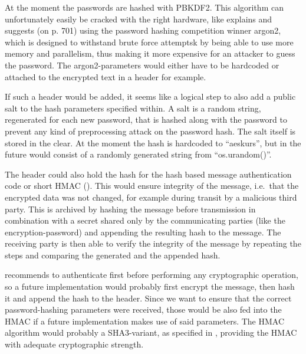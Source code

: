 At the moment the passwords are hashed with PBKDF2. This algorithm can
unfortunately easily be cracked with the right hardware, like \cite[p. 697]{appcrypt} explains and suggests (on p. 701) using the password hashing
competition winner argon2, which is designed to withstand brute force
attemptsk by being able to use more memory and parallelism, thus making it
more expensive for an attacker to guess the password. The
argon2-parameters would either have to be hardcoded or attached to the
encrypted text in a header for example.

If such a header would be added, it seems like a logical step to also
add a public salt to the hash parameters specified within. A salt is a
random string, regenerated for each new password, that is hashed along
with the password to prevent any kind of preprocessing attack on the
password hash. The salt itself is stored in the clear. \cite[p. 693]{appcrypt} At
the moment the hash is hardcoded to ``aeskurs'', but in the future would
consist of a randomly generated string from ``os.urandom()''.

The header could also hold the hash for the hash based message
authentication code or short HMAC (\cite[ch. 12.2.3]{paar}). This would ensure
integrity of the message, i.e.~that the encrypted data was not changed,
for example during transit by a malicious third party. This is archived
by hashing the message before transmission in combination with a secret
shared only by the communicating parties (like the encryption-password)
and appending the resulting hash to the message. The receiving party is
then able to verify the integrity of the message by repeating the steps
and comparing the generated and the appended hash.

\cite{moxie} recommends to authenticate first before performing any
cryptographic operation, so a future implementation would probably first
encrypt the message, then hash it and append the hash to the header.
Since we want to ensure that the correct password-hashing parameters
were received, those would be also fed into the HMAC if a future
implementation makes use of said parameters. The HMAC algorithm would
probably a SHA3-variant, as specified in \cite{fips202}, providing the HMAC
with adequate cryptographic strength.
